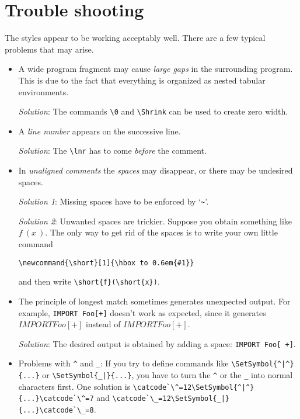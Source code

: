 


\section{Trouble shooting}


The styles appear to be working acceptably well. There are a few typical
problems that may arise.

\begin{itemize}
  \item A wide program fragment may cause \emph{large gaps} in the
    surrounding program. This is due to the fact that everything is
    organized as nested tabular environments.

    \emph{Solution}: The commands \verb+\0+ and \verb+\Shrink+ can be used
    to create zero width.
    
  \item A \emph{line number} appears on the successive line.
    
    \emph{Solution}: The \verb+\lnr+ has to come \emph{before} the comment.

  \item In \emph{unaligned comments} the \emph{spaces} may disappear, or
    there may be undesired spaces.

    \emph{Solution 1}: Missing spaces have to be enforced by `\verb+~+'.

    \emph{Solution 2}: Unwanted spaces are trickier. Suppose you obtain
    something like $f~(x~)$. The only way to get rid of the spaces is to
    write your own little command

    \verb+\newcommand{\short}[1]{\hbox to 0.6em{#1}}+ 

    and then write \verb+\short{f}(\short{x})+.
    
  \item The principle of longest match sometimes generates unexpected
    output. For example, \verb=IMPORT Foo[+]= doesn't work as expected,
    since it generates \(IMPORT Foo[+]\) instead of \(IMPORT Foo[ +]\).

    \emph{Solution}: The desired output is obtained by adding a space:
    \verb=IMPORT Foo[ +]=.
    
  \item Problems with \verb=^= and \verb=_=: If you try to define commands
    like \verb=\SetSymbol{^|^}{...}= or \verb=\SetSymbol{_|}{...}=, you
    have to turn the \verb=^= or the \verb=_= into normal characters first.
    One solution is
    \verb+\catcode`\^=12\SetSymbol{^|^}{...}\catcode`\^=7+ and
    \verb+\catcode`\_=12\SetSymbol{_|}{...}\catcode`\_=8+.
    

\end{itemize}
